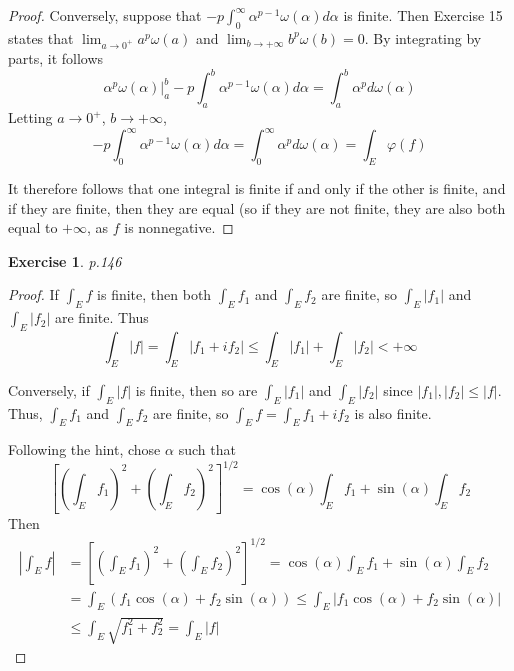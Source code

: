 \documentclass[11pt,a4paper]{article}
\newcommand{\alp}{\alpha}
\renewcommand{\(}{\left(}
\renewcommand{\)}{\right)}
\renewcommand{\[}{\left[}
\renewcommand{\]}{\right]}
\newtheorem{exercise}{Exercise}
\begin{document}
\begin{proof}
  	Conversely, suppose that $-p\int_{0}^{\infty}\alp^{p-1}\omega(\alp)d\alp$ is finite. Then Exercise 15 states that $\lim_{a\rightarrow 0^+}a^p\omega(a)$ and $\lim_{b\rightarrow +\infty}b^p\omega(b)=0$. By integrating by parts, it follows
  	$$
  	\alp^p\omega(\alp)\bigg\vert_a^b -p\int_{a}^{b}\alp^{p-1}\omega(\alp)d\alp = \int_{a}^{b}\alp^pd\omega(\alp)
  	$$
  	Letting $a \rightarrow 0^+$, $b \rightarrow +\infty$,
  	$$
  	-p\int_{0}^{\infty}\alp^{p-1}\omega(\alp)d\alp = \int_{0}^{\infty}\alp^pd\omega(\alp) = \int_E\varphi(f)
  	$$
  	
  	It therefore follows that one integral is finite if and only if the other is finite, and if they are finite, then they are equal (so if they are not finite, they are also both equal to $+\infty$, as $f$ is nonnegative.
  \end{proof}
  
  \setcounter{exercise}{0}
  \begin{exercise}
  	p.146
  \end{exercise}
  \begin{proof}
  	If $\int_Ef$ is finite, then both $\int_Ef_1$ and $\int_Ef_2$ are finite, so $\int_E|f_1|$ and $\int_E|f_2|$ are finite. Thus
  	$$
  	\int_E|f| = \int_E |f_1+if_2| \le \int_E|f_1| + \int_E|f_2| < +\infty
  	$$
  	
  	Conversely, if $\int_E|f|$ is finite, then so are $\int_E|f_1|$ and $\int_E|f_2|$ since $|f_1|,|f_2|\le |f|$. Thus, $\int_Ef_1$ and $\int_Ef_2$ are finite, so $\int_Ef = \int_E f_1+if_2$ is also finite.
  	
  	Following the hint, chose $\alp$ such that 
  	$$
  	\left[ \(\int_Ef_1\)^2+\(\int_Ef_2\)^2\right] ^{1/2} = \cos(\alp)\int_Ef_1 + \sin(\alp)\int_Ef_2
  	$$
  	Then
  	\begin{align*}
  	\left|\int_Ef\right| &= \left[ \(\int_Ef_1\)^2+\(\int_Ef_2\)^2\right] ^{1/2} 
  	= \cos(\alp)\int_Ef_1 + \sin(\alp)\int_Ef_2 \\
  	&= \int_E (f_1\cos(\alp)+f_2\sin(\alp)) 
  	\le \int_E |f_1\cos(\alp)+f_2\sin(\alp)|\\
  	&\le \int_E \sqrt{f_1^2+f_2^2} = \int_E|f|
  	\end{align*}
  \end{proof}
  
\end{document}
